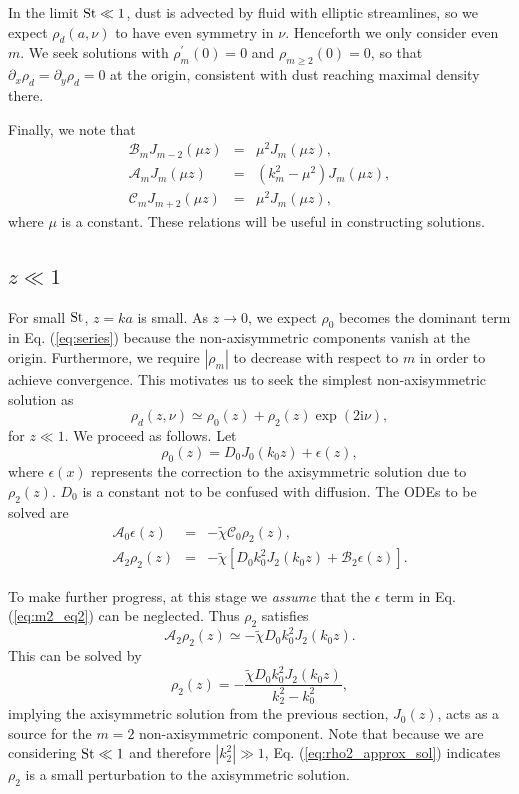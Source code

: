 \documentclass[apj]{emulateapj}
\newcommand{\Eq}[1]{Eq. (\ref{#1})}
\newcommand{\eq}[1]{\Eq{#1}}
\newcommand{\beq}{\begin{equation}}
\newcommand{\eeq}{\end{equation}}
\newcommand{\beqn}{\begin{eqnarray}}
\newcommand{\eeqn}{\end{eqnarray}}
\begin{document}
In the limit $\rm{St}\ll 1$, dust is advected by fluid with elliptic
streamlines, so we expect $\rho_d(a,\nu)$ to have even symmetry in
$\nu$. Henceforth we only consider even $m$. We seek solutions with  
$\rho_m^\prime(0)=0$ and $\rho_{m\geq2}(0)=0$, so that
$\partial_x\rho_d=\partial_y\rho_d=0$ at the origin, consistent with 
dust reaching maximal density there.  

Finally, we note that
\beqn\label{eq:ops2}
\mathcal{B}_mJ_{m-2}(\mu z) &=& \mu^2J_m(\mu z),\\
\mathcal{A}_mJ_m(\mu z) &=& \left(k_m^2 - \mu^2\right)J_m(\mu z),\\
\mathcal{C}_mJ_{m+2}(\mu z) &= & \mu^2J_m(\mu z),
\eeqn
where $\mu$ is a constant. These relations will be useful in
constructing solutions. 

\subsection{$z\ll 1$}
For small $\rm{St}$, $z=ka$ is small. As $z\to 0$, we expect $\rho_0$
becomes the dominant term in \eq{eq:series} because the
non-axisymmetric components vanish at the origin. Furthermore, we
require $|\rho_m|$ to decrease with respect to $m$ in order to achieve
convergence. This motivates us to seek the simplest non-axisymmetric solution as  
\beq
\rho_d(z,\nu) \simeq \rho_0(z) + \rho_2(z)\exp{\left(2\mathrm{i}\nu\right)},  
\eeq
for $z\ll 1$. We proceed as follows. Let
\beq
\rho_0(z) = D_0J_0(k_0z) + \epsilon(z),  
\eeq
where $\epsilon(x)$ represents the correction to the axisymmetric
solution due to $\rho_2(z)$. $D_0$ is a constant not to be confused
with diffusion. The ODEs to be
solved are 
\beqn 
\mathcal{A}_0\epsilon(z) &=& -\tilde{\chi}\mathcal{C}_0\rho_2(z),\label{eq:m2_eq1}\\
\mathcal{A}_2\rho_2(z) &=& -\tilde{\chi}\left[D_0k_0^2J_2(k_0z) +
  \mathcal{B}_2\epsilon(z)\right].\label{eq:m2_eq2} 
\eeqn

To make further progress, at this stage we \emph{assume} that the
$\epsilon$ term in \eq{eq:m2_eq2} can be neglected. Thus $\rho_2$ satisfies
\beq\label{eq:rho2_approx}
\mathcal{A}_2\rho_2(z) \simeq -\tilde{\chi}D_0k_0^2J_2(k_0z).
\eeq
This can be solved by 
\beq\label{eq:rho2_approx_sol}
\rho_2(z)  = -\frac{\tilde{\chi}D_0k_0^2J_2(k_0z)}{k_2^2 - k_0^2}, 
\eeq
implying the axisymmetric solution from the previous section, 
$J_0(z)$, acts as a source for the $m=2$ non-axisymmetric
component. Note that because we are considering $\rm{St}\ll1$ and
therefore $|k_2^2|\gg1$, \eq{eq:rho2_approx_sol} indicates $\rho_2$
is a small perturbation to the axisymmetric solution.     
\end{document}
